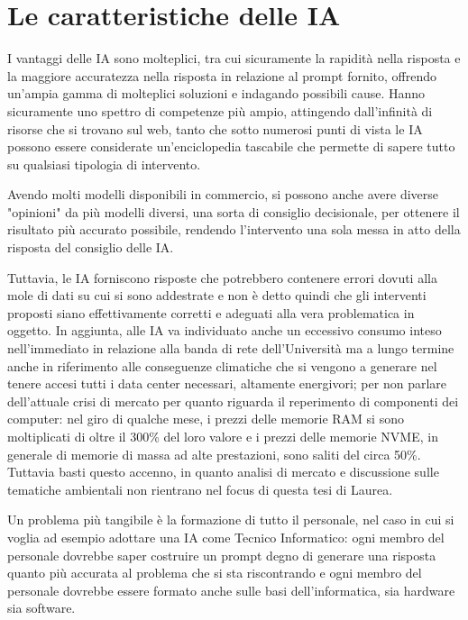         \section{Le caratteristiche delle IA}
            \par
                I vantaggi delle IA sono molteplici, tra cui sicuramente la rapidità nella risposta e la maggiore accuratezza nella risposta in relazione al prompt fornito, offrendo un'ampia gamma di molteplici soluzioni e indagando possibili cause. Hanno sicuramente uno spettro di competenze più ampio, attingendo dall'infinità di risorse che si trovano sul web, tanto che sotto numerosi punti di vista le IA possono essere considerate un'enciclopedia tascabile che permette di sapere tutto su qualsiasi tipologia di intervento. 
            \par
                Avendo molti modelli disponibili in commercio, si possono anche avere diverse "opinioni" da più modelli diversi, una sorta di consiglio decisionale, per ottenere il risultato più accurato possibile, rendendo l'intervento una sola messa in atto della risposta del consiglio delle IA.
            \par
                Tuttavia, le IA forniscono risposte che potrebbero contenere errori dovuti alla mole di dati su cui si sono addestrate e non è detto quindi che gli interventi proposti siano effettivamente corretti e adeguati alla vera problematica in oggetto. \newline
                In aggiunta, alle IA va individuato anche un eccessivo consumo inteso nell'immediato in relazione alla banda di rete dell'Università ma a lungo termine anche in riferimento alle conseguenze climatiche che si vengono a generare nel tenere accesi tutti i data center necessari, altamente energivori; per non parlare dell'attuale crisi di mercato per quanto riguarda il reperimento di componenti dei computer: nel giro di qualche mese, i prezzi delle memorie RAM si sono moltiplicati di oltre il 300\% del loro valore e i prezzi delle memorie NVME, in generale di memorie di massa ad alte prestazioni, sono saliti del circa 50\%. \newline
                Tuttavia basti questo accenno, in quanto analisi di mercato e discussione sulle tematiche ambientali non rientrano nel focus di questa tesi di Laurea. 
            \par
                Un problema più tangibile è la formazione di tutto il personale, nel caso in cui si voglia ad esempio adottare una IA come Tecnico Informatico: ogni membro del personale dovrebbe saper costruire un prompt degno di generare una risposta quanto più accurata al problema che si sta riscontrando e ogni membro del personale dovrebbe essere formato anche sulle basi dell'informatica, sia hardware sia software. 
